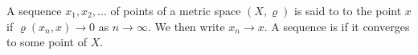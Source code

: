 A sequence $x_1, x_2, \ldots$ of points of a metric space $(X, \varrho)$ is said to  to the point $x$ if $\varrho(x_n, x) \to 0$ as $n \to \infty$. We then write $x_n \to x$. A sequence is  if it converges to some point of $X$.
